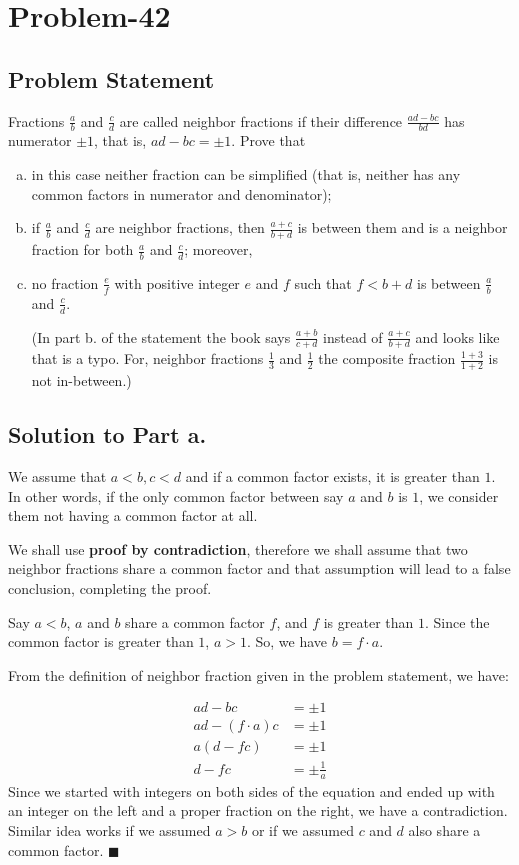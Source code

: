 \documentclass{article}
\begin{document}
\section*{Problem-42}

\subsection*{Problem Statement}
Fractions $\frac{a}{b}$ and $\frac{c}{d}$ are called neighbor fractions if their difference $\frac{ad-bc}{bd}$ has numerator $\pm 1$, that is, $ad-bc = \pm 1$. Prove that 
\begin{enumerate}[a.]
\item in this case neither fraction can be simplified (that is, neither has any common factors in numerator and denominator);
\item if $\frac{a}{b}$ and $\frac{c}{d}$ are neighbor fractions, then $\frac{a+c}{b+d}$ is between them and is a neighbor fraction for both $\frac{a}{b}$ and $\frac{c}{d}$; moreover,
\item no fraction $\frac{e}{f}$ with positive integer $e$ and $f$ such that $f < b+d$ is between $\frac{a}{b}$ and $\frac{c}{d}$.

(In part b. of the statement the book says $\frac{a+b}{c+d}$ instead of $\frac{a+c}{b+d}$ and looks like that is a typo. For, neighbor fractions $\frac{1}{3}$ and $\frac{1}{2}$ the composite fraction $\frac{1+3}{1+2}$ is not in-between.)
\end{enumerate}
\subsection*{Solution to Part a.}
We assume that $a < b, c < d$ and if a common factor exists, it is greater than $1$. In other words, if the only common factor between say $a$ and $b$ is $1$, we consider them not having a common factor at all.

We shall use \textbf{proof by contradiction}, therefore we shall assume that two neighbor fractions share a common factor and that assumption will lead to a false conclusion, completing the proof. 

Say $a < b$, $a$ and $b$ share a common factor $f$, and $f$ is greater than $1$. Since the common factor is greater than $1$, $a > 1$. So, we have $b = f\cdot a$.

From the definition of neighbor fraction given in the problem statement, we have:

\begin{displaymath}
\begin{split}
	ad - bc         & = \pm 1\\
	ad-(f \cdot a)c & = \pm 1\\
	a(d-fc)         & = \pm 1\\
	d-fc            & = \pm \frac{1}{a}
\end{split}
\end{displaymath}
Since we started with integers on both sides of the equation and ended up with an integer on the left and a proper fraction on the right, we have a contradiction. Similar idea works if we assumed $a > b$ or if we assumed $c$ and $d$ also share a common factor. $\blacksquare$
\end{document}
